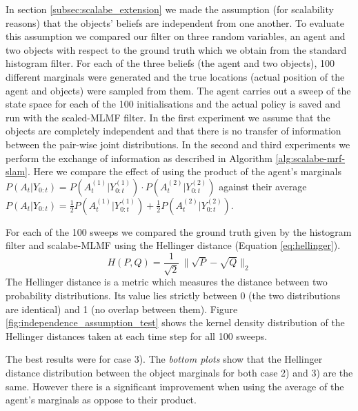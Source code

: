 In section \ref{subsec:scalabe_extension} we made the assumption (for scalability reasons) that the objects' beliefs are independent
from one another. To evaluate this assumption we compared our filter on three random variables, an agent and two objects with respect to the ground truth
which we obtain from the standard histogram filter. For each of the three beliefs (the agent and two objects), 100 different marginals 
were generated and the true locations (actual position of the agent and objects) were sampled from them. 
The agent carries out  a sweep of the state space for each of the 100 initialisations and the actual policy is saved 
and run with the scaled-MLMF filter. In the first experiment we assume that the objects are completely independent 
and that there is no transfer of information between the pair-wise joint distributions. In the second and third experiments we perform the exchange of information as 
described in Algorithm \ref{alg:scalabe-mrf-slam}. Here we compare the effect of using the product of the agent's marginals $P(A_t|Y_{0:t}) = P(A^{(1)}_t|Y^{(1)}_{0:t}) \cdot P(A^{(2)}_t|Y^{(2)}_{0:t})$ 
against their average $P(A_t|Y_{0:t}) = \frac{1}{2}P(A^{(1)}_t|Y^{(1)}_{0:t}) + \frac{1}{2}P(A^{(2)}_t|Y^{(2)}_{0:t})$. 

For each of the 100 sweeps we compared the ground truth given by the histogram filter and scalabe-MLMF using the Hellinger distance (Equation \ref{eq:hellinger}).
\begin{equation} \label{eq:hellinger}
 H(P,Q) = \frac{1}{\sqrt{2}}\, \|\sqrt{P} - \sqrt{Q}\|_2  
\end{equation}
The Hellinger distance is a metric which measures the distance between two probability distributions. Its value lies strictly between 0 (the two 
distributions are identical) and 1 (no overlap between them). Figure \ref{fig:independence_assumption_test} shows the kernel density 
distribution of the Hellinger distances taken at each time step for all 100 sweeps.

The best results were for case 3). The \textit{bottom plots} show that the Hellinger distance distribution between the
object marginals for both case 2) and 3) are the same. However there is a significant improvement when using the average of the agent's marginals as oppose to 
their product. 

